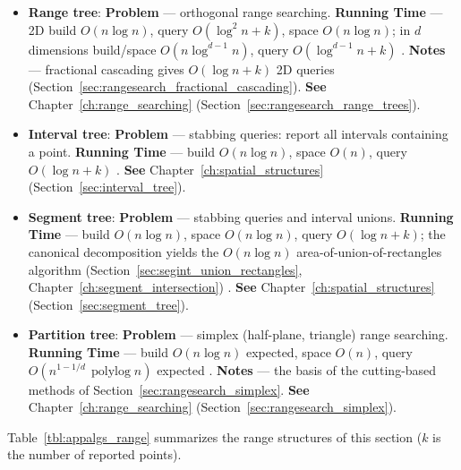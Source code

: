 \begin{itemize}
  \item \textbf{Range tree}: \textbf{Problem} ---
    orthogonal range searching. \textbf{Running Time} --- 2D build
    $O(n\log n)$, query $O(\log^2 n + k)$, space $O(n\log n)$; in
    $d$ dimensions build/space $O(n\log^{d-1} n)$, query
    $O(\log^{d-1} n + k)$ \cite{deberg2008}. \textbf{Notes} --- fractional
    cascading gives $O(\log n + k)$ 2D queries
    (Section~\ref{sec:rangesearch_fractional_cascading}). \textbf{See}
    Chapter~\ref{ch:range_searching} (Section~\ref{sec:rangesearch_range_trees}).
  \item \textbf{Interval tree}: \textbf{Problem} ---
    stabbing queries: report all intervals containing a point.
    \textbf{Running Time} --- build $O(n\log n)$, space $O(n)$, query
    $O(\log n + k)$ \cite{edelsbrunner1980, deberg2008}. \textbf{See}
    Chapter~\ref{ch:spatial_structures} (Section~\ref{sec:interval_tree}).
  \item \textbf{Segment tree}: \textbf{Problem} ---
    stabbing queries and interval unions. \textbf{Running Time} --- build
    $O(n\log n)$, space $O(n\log n)$, query $O(\log n + k)$; the canonical
    decomposition yields the $O(n\log n)$ area-of-union-of-rectangles
    algorithm (Section~\ref{sec:segint_union_rectangles},
    Chapter~\ref{ch:segment_intersection}) \cite{deberg2008}. \textbf{See}
    Chapter~\ref{ch:spatial_structures} (Section~\ref{sec:segment_tree}).
  \item \textbf{Partition tree}: \textbf{Problem} ---
    simplex (half-plane, triangle) range searching. \textbf{Running Time} ---
    build $O(n\log n)$ expected, space $O(n)$, query
    $O(n^{1-1/d}\,\operatorname{polylog} n)$ expected \cite{matousek1992partition}.
    \textbf{Notes} --- the basis of the cutting-based methods of
    Section~\ref{sec:rangesearch_simplex}. \textbf{See}
    Chapter~\ref{ch:range_searching} (Section~\ref{sec:rangesearch_simplex}).
\end{itemize}

Table~\ref{tbl:appalgs_range} summarizes the range structures of this
section ($k$ is the number of reported points).

